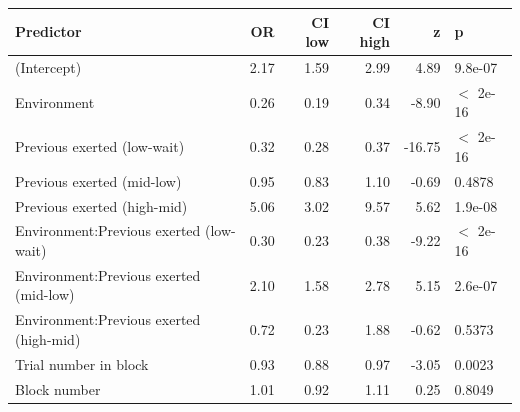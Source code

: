 \begin{table}[ht]
\centering
\begin{tabular}{lrrrrl}
  \hline
Predictor & OR & CI low & CI high & z & p \\ 
  \hline
(Intercept) & 2.17 & 1.59 & 2.99 & 4.89 & 9.8e-07 \\ 
  Environment & 0.26 & 0.19 & 0.34 & -8.90 & $<$ 2e-16 \\ 
  Previous exerted (low-wait) & 0.32 & 0.28 & 0.37 & -16.75 & $<$ 2e-16 \\ 
  Previous exerted (mid-low) & 0.95 & 0.83 & 1.10 & -0.69 & 0.4878 \\ 
  Previous exerted (high-mid) & 5.06 & 3.02 & 9.57 & 5.62 & 1.9e-08 \\ 
  Environment:Previous exerted (low-wait) & 0.30 & 0.23 & 0.38 & -9.22 & $<$ 2e-16 \\ 
  Environment:Previous exerted (mid-low) & 2.10 & 1.58 & 2.78 & 5.15 & 2.6e-07 \\ 
  Environment:Previous exerted (high-mid) & 0.72 & 0.23 & 1.88 & -0.62 & 0.5373 \\ 
  Trial number in block & 0.93 & 0.88 & 0.97 & -3.05 & 0.0023 \\ 
  Block number & 1.01 & 0.92 & 1.11 & 0.25 & 0.8049 \\ 
   \hline
\end{tabular}
\end{table}
